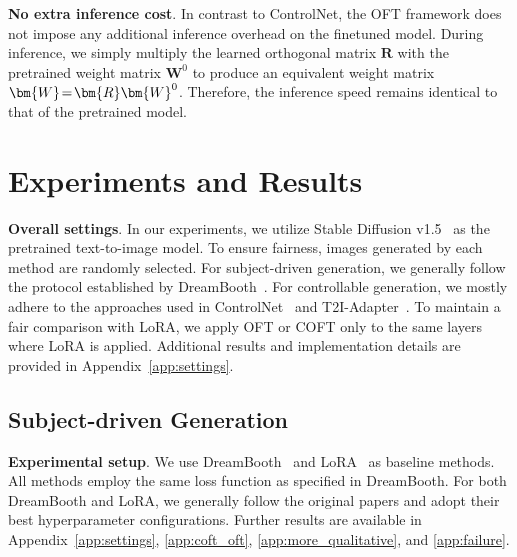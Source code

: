 \textbf{No extra inference cost}. In contrast to ControlNet, the OFT framework does not impose any additional inference overhead on the finetuned model. During inference, we simply multiply the learned orthogonal matrix $\bm{R}$ with the pretrained weight matrix $\bm{W}^0$ to produce an equivalent weight matrix $\thickmuskip=2mu \medmuskip=2mu \bm{W}=\bm{R}\bm{W}^0$. Therefore, the inference speed remains identical to that of the pretrained model.

\section{Experiments and Results}

\textbf{Overall settings}. In our experiments, we utilize Stable Diffusion v1.5~\cite{rombach2022high} as the pretrained text-to-image model. To ensure fairness, images generated by each method are randomly selected. For subject-driven generation, we generally follow the protocol established by DreamBooth~\cite{ruiz2023dreambooth}. For controllable generation, we mostly adhere to the approaches used in ControlNet~\cite{zhang2023adding} and T2I-Adapter~\cite{mou2023t2i}. To maintain a fair comparison with LoRA, we apply OFT or COFT only to the same layers where LoRA is applied. Additional results and implementation details are provided in Appendix~\ref{app:settings}.

\subsection{Subject-driven Generation}

\textbf{Experimental setup}. We use DreamBooth~\cite{ruiz2023dreambooth} and LoRA~\cite{hulora2022} as baseline methods. All methods employ the same loss function as specified in DreamBooth. For both DreamBooth and LoRA, we generally follow the original papers and adopt their best hyperparameter configurations. Further results are available in Appendix~\ref{app:settings}, \ref{app:coft_oft}, \ref{app:more_qualitative}, and \ref{app:failure}.

